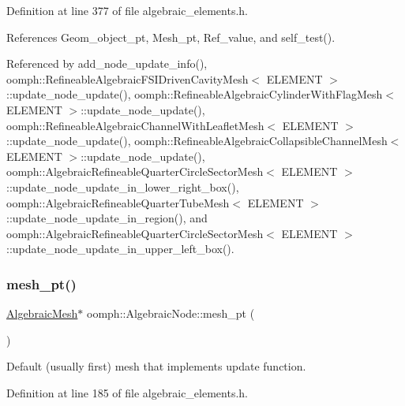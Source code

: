 Definition at line 377 of file algebraic\+\_\+elements.\+h.



References Geom\+\_\+object\+\_\+pt, Mesh\+\_\+pt, Ref\+\_\+value, and self\+\_\+test().



Referenced by add\+\_\+node\+\_\+update\+\_\+info(), oomph\+::\+Refineable\+Algebraic\+F\+S\+I\+Driven\+Cavity\+Mesh$<$ E\+L\+E\+M\+E\+N\+T $>$\+::update\+\_\+node\+\_\+update(), oomph\+::\+Refineable\+Algebraic\+Cylinder\+With\+Flag\+Mesh$<$ E\+L\+E\+M\+E\+N\+T $>$\+::update\+\_\+node\+\_\+update(), oomph\+::\+Refineable\+Algebraic\+Channel\+With\+Leaflet\+Mesh$<$ E\+L\+E\+M\+E\+N\+T $>$\+::update\+\_\+node\+\_\+update(), oomph\+::\+Refineable\+Algebraic\+Collapsible\+Channel\+Mesh$<$ E\+L\+E\+M\+E\+N\+T $>$\+::update\+\_\+node\+\_\+update(), oomph\+::\+Algebraic\+Refineable\+Quarter\+Circle\+Sector\+Mesh$<$ E\+L\+E\+M\+E\+N\+T $>$\+::update\+\_\+node\+\_\+update\+\_\+in\+\_\+lower\+\_\+right\+\_\+box(), oomph\+::\+Algebraic\+Refineable\+Quarter\+Tube\+Mesh$<$ E\+L\+E\+M\+E\+N\+T $>$\+::update\+\_\+node\+\_\+update\+\_\+in\+\_\+region(), and oomph\+::\+Algebraic\+Refineable\+Quarter\+Circle\+Sector\+Mesh$<$ E\+L\+E\+M\+E\+N\+T $>$\+::update\+\_\+node\+\_\+update\+\_\+in\+\_\+upper\+\_\+left\+\_\+box().

\mbox{\label{classoomph_1_1AlgebraicNode_a929a96691397e1990fdf785dfcea5c07}} 
\subsubsection{\texorpdfstring{mesh\+\_\+pt()}{mesh\_pt()}\hspace{0.1cm}{\footnotesize\ttfamily [1/2]}}
{\footnotesize\ttfamily \hyperlink{classoomph_1_1AlgebraicMesh}{Algebraic\+Mesh}$\ast$ oomph\+::\+Algebraic\+Node\+::mesh\+\_\+pt (\begin{DoxyParamCaption}{ }\end{DoxyParamCaption})\hspace{0.3cm}{\ttfamily [inline]}}



Default (usually first) mesh that implements update function. 



Definition at line 185 of file algebraic\+\_\+elements.\+h.



